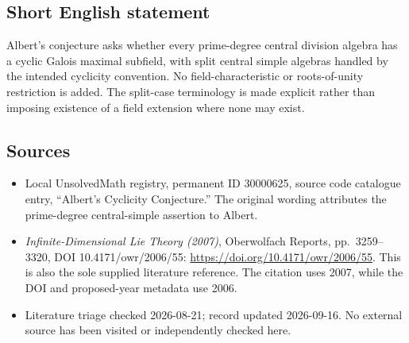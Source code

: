 \documentclass[11pt]{article}
\begin{document}
\subsection{Short English statement}
Albert's conjecture asks whether every prime-degree central division algebra has a cyclic Galois maximal subfield, with split central simple algebras handled by the intended cyclicity convention. No field-characteristic or roots-of-unity restriction is added. The split-case terminology is made explicit rather than imposing existence of a field extension where none may exist.
\subsection{Sources}
\begin{itemize}
\item Local UnsolvedMath registry, permanent ID 30000625, source code catalogue entry, ``Albert's Cyclicity Conjecture.'' The original wording attributes the prime-degree central-simple assertion to Albert.
\item \emph{Infinite-Dimensional Lie Theory (2007)}, Oberwolfach Reports, pp.\ 3259--3320, DOI 10.4171/owr/2006/55: \url{https://doi.org/10.4171/owr/2006/55}. This is also the sole supplied literature reference. The citation uses 2007, while the DOI and proposed-year metadata use 2006.
\item Literature triage checked 2026-08-21; record updated 2026-09-16. No external source has been visited or independently checked here.
\end{itemize}
\end{document}
